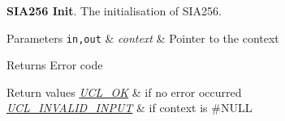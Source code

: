 {\bfseries S\+I\+A256 Init}. The initialisation of S\+I\+A256.


\begin{DoxyParams}[1]{Parameters}
\mbox{\tt in,out}  & {\em context} & Pointer to the context\\
\hline
\end{DoxyParams}
\begin{DoxyReturn}{Returns}
Error code
\end{DoxyReturn}

\begin{DoxyRetVals}{Return values}
{\em \hyperlink{group___u_c_l___r_e_t_u_r_n_gaf4aeb5212f5aa1b3a12b3dea7eb1785d}{U\+C\+L\+\_\+\+OK}} & if no error occurred \\
\hline
{\em \hyperlink{group___u_c_l___r_e_t_u_r_n_ga0ce984d38effddf33eb42be5ff3d87cf}{U\+C\+L\+\_\+\+I\+N\+V\+A\+L\+I\+D\+\_\+\+I\+N\+P\+UT}} & if {\ttfamily context} is \#\+N\+U\+LL \\
\hline
\end{DoxyRetVals}
